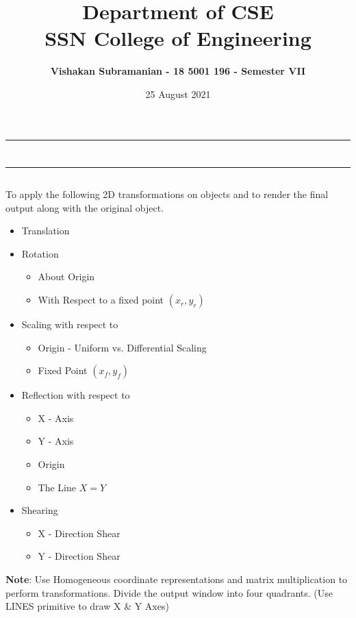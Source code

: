 \documentclass[12pt, a4]{article}
\title{\textbf{Department of CSE\\SSN College of Engineering}}
\author{\textbf{Vishakan Subramanian - 18 5001 196 - Semester VII}}
\date{25 August 2021}
\begin{document}
\maketitle
\hrule
\section*{}
\hrule
\bigskip

\subsection*{}
\subsection*{}
\begin{flushleft}

To apply the following 2D transformations on objects and to render the final output along with the
original object.

\begin{itemize}
\item Translation
\item Rotation
	\begin{itemize}
		\item About Origin
		\item With Respect to a fixed point $(x_r, y_r)$
	\end{itemize}
\item Scaling with respect to
	\begin{itemize}
		\item Origin - Uniform vs. Differential Scaling
		\item Fixed Point $(x_f, y_f)$
	\end{itemize}
\newpage
\item Reflection with respect to
	\begin{itemize}
		\item X - Axis
		\item Y - Axis
		\item Origin
		\item The Line $X = Y$
	\end{itemize}
\item Shearing
	\begin{itemize}
		\item X - Direction Shear
		\item Y - Direction Shear
	\end{itemize}
\end{itemize}


\textbf{Note}: Use Homogeneous coordinate representations and matrix multiplication to perform transformations. Divide the output window into four quadrants. 
\newline (Use LINES primitive to draw X \& Y Axes)
 
\end{flushleft}
\end{document}
